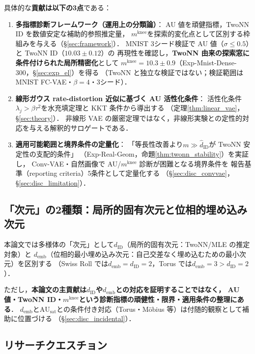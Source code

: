 \documentclass[11pt,a4paper]{jsarticle}
\newcommand{\dID}{d_{\mathrm{ID}}}
\newcommand{\AUsat}{\mathrm{AU}_{\mathrm{sat}}}
\newcommand{\mknee}{m^{\mathrm{knee}}}
\newcommand{\demb}{d_{\mathrm{emb}}}
\begin{document}
具体的な\textbf{貢献は以下の3点}である：
\begin{enumerate}
  \item \textbf{多指標診断フレームワーク（運用上の分類論）}：
        AU 値を頑健指標，TwoNN ID を数値安定な補助的参照推定量，
        $\mknee$を探索的変化点として区別する枠組みを与える（§\ref{sec:framework}）．
        MNIST 3シード検証で AU 値（$\sigma \leq 0.5$）と TwoNN ID（$10.03 \pm 0.12$）の
        再現性を確認し，\textbf{TwoNN 由来の探索窓に条件付けられた局所精密化}として
        $\mknee = 10.3 \pm 0.9$（Exp-Mnist-Dense-300，§\ref{sec:exp_el}）を得る
        （TwoNN と独立な検証ではない；検証範囲は MNIST FC-VAE・$\beta = 4$・3シード）．
  \item \textbf{線形ガウス rate-distortion 近似に基づく AU 活性化条件}：
        活性化条件$\lambda_j > \beta\tau^2$を水充填定理と KKT 条件から導出する
        （定理\ref{thm:linear_vae}，§\ref{sec:theory}）．
        非線形 VAE の厳密定理ではなく，非線形実験との定性的対応を与える解釈的サロゲートである．
  \item \textbf{適用可能範囲と境界条件の定量化}：
        「等長性改善より$m \gg \hat{d}_\mathrm{ID}$が TwoNN 安定性の支配的条件」
        （Exp-Real-Geom，命題\ref{thm:twonn_stability}）を実証し，
        Conv-VAE・自然画像で AU/$\mknee$ 診断が困難となる境界条件を
        報告基準（reporting criteria）5条件として定量化する
        （§\ref{sec:disc_convvae}，§\ref{sec:disc_limitation}）．
\end{enumerate}

\subsection{「次元」の2種類：局所的固有次元と位相的埋め込み次元}\label{sec:intro_dim}

本論文では多様体の「次元」として$\dID$（局所的固有次元：TwoNN/MLE の推定対象）と
$\demb$（位相的最小埋め込み次元：自己交差なく埋め込むための最小次元）を区別する
（Swiss Roll では$\demb = \dID = 2$，Torus では$\demb = 3 > \dID = 2$）．

ただし，\textbf{本論文の主貢献は$\dID$や$\demb$との対応を証明することではなく，
AU 値・TwoNN ID・$\mknee$という診断指標の頑健性・限界・適用条件の整理にある}．
$\demb$と$\AUsat$との条件付き対応（Torus・Möbius 等）は付随的観察として補助に位置づける
（§\ref{sec:disc_incidental}）．

\subsection{リサーチクエスチョン}\label{sec:intro_rq}
\end{document}
